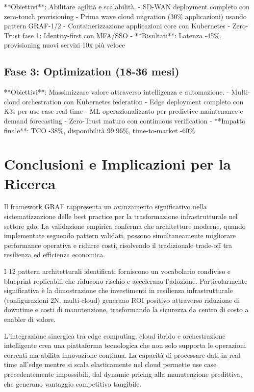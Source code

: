 **Obiettivi**: Abilitare agilità e scalabilità.
- SD-WAN deployment completo con zero-touch provisioning
- Prima wave cloud migration (30\% applicazioni) usando pattern GRAF-1/2
- Containerizzazione applicazioni core con Kubernetes
- Zero-Trust fase 1: Identity-first con MFA/SSO
- **Risultati**: Latenza -45\%, provisioning nuovi servizi 10x più veloce

\subsection{\texorpdfstring{Fase 3: Optimization (18-36 mesi)}{3.7.3 - Fase 3: Optimization (18-36 mesi)}}

**Obiettivi**: Massimizzare valore attraverso intelligenza e automazione.
- Multi-cloud orchestration con Kubernetes federation
- Edge deployment completo con K3s per use case real-time
- ML operazionalizzato per predictive maintenance e demand forecasting
- Zero-Trust maturo con continuous verification
- **Impatto finale**: TCO -38\%, disponibilità 99.96\%, time-to-market -60\%

\section{\texorpdfstring{Conclusioni e Implicazioni per la Ricerca}{3.8 - Conclusioni e Implicazioni per la Ricerca}}
\label{sec:cap3_conclusioni}

Il framework GRAF rappresenta un avanzamento significativo nella sistematizzazione delle best practice per la trasformazione infrastrutturale nel settore \gls{gdo}. La validazione empirica conferma che architetture moderne, quando implementate seguendo pattern validati, possono simultaneamente migliorare performance operativa e ridurre costi, risolvendo il tradizionale trade-off tra resilienza ed efficienza economica.

I 12 pattern architetturali identificati forniscono un vocabolario condiviso e blueprint replicabili che riducono rischio e accelerano l'adozione. Particolarmente significativa è la dimostrazione che investimenti in resilienza infrastrutturale (configurazioni 2N, multi-cloud) generano ROI positivo attraverso riduzione di downtime e costi di manutenzione, trasformando la sicurezza da centro di costo a enabler di valore.

L'integrazione sinergica tra edge computing, cloud ibrido e orchestrazione intelligente crea una piattaforma tecnologica che non solo supporta le operazioni correnti ma abilita innovazione continua. La capacità di processare dati in real-time all'edge mentre si scala elasticamente nel cloud permette use case precedentemente impossibili, dal dynamic pricing alla manutenzione predittiva, che generano vantaggio competitivo tangibile.

